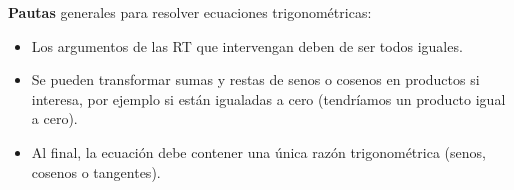 \vspace{5mm}
\begin{cuadro-naranja}
\textbf{Pautas} generales para resolver ecuaciones trigonométricas:
\begin{adjustwidth}{20pt}{20pt}
\begin{itemize}
\item Los argumentos de las RT que intervengan deben de ser todos iguales.	
\item Se pueden transformar sumas y restas de senos o cosenos en productos si interesa, por ejemplo si están igualadas a cero (tendríamos un producto igual a cero).
\item Al final, la ecuación debe contener una única razón trigonométrica (senos, cosenos o tangentes).
\end{itemize}
\end{adjustwidth}
\end{cuadro-naranja}

\vspace{5mm}

